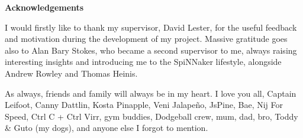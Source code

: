 \vspace*{1.5cm}
{ \huge \bfseries Acknowledgements}
\vspace{7mm}

I would firstly like to thank my supervisor, David Lester, for the useful feedback and motivation during the development of my project. Massive gratitude goes also to Alan Bary Stokes, who became a second supervisor to me, always raising interesting insights and introducing me to the SpiNNaker lifestyle, alongside Andrew Rowley and Thomas Heinis.

As always, friends and family will always be in my heart. I love you all, Captain Leifoot, Canny Dattlin, Kosta Pinapple, Veni Jalapeño, JsPine, Bae, Nij For Speed, Ctrl C + Ctrl Virr, gym buddies, Dodgeball crew, mum, dad, bro, Toddy \& Guto (my dogs), and anyone else I forgot to mention.